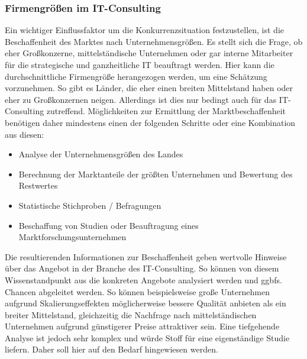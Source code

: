  \subsubsection{Firmengrößen im IT-Consulting}
Ein wichtiger Einflussfaktor um die Konkurrenzsituation festzustellen, ist die Beschaffenheit des Marktes nach Unternehmensgrößen.
 Es stellt sich die Frage, ob eher Großkonzerne, mittelständische Unternehmen oder gar interne Mitarbeiter für die strategische und ganzheitliche IT beauftragt werden.
 Hier kann die durchschnittliche Firmengröße herangezogen werden, um eine Schätzung vorzunehmen. So gibt es Länder, die eher einen breiten Mittelstand haben oder eher zu Großkonzernen neigen. 
 Allerdings ist dies nur bedingt auch für das IT-Consulting zutreffend. 
Möglichkeiten zur Ermittlung der Marktbeschaffenheit benötigen daher mindestens einen der folgenden Schritte oder eine Kombination aus diesen:
\begin{itemize}
\item Analyse der Unternehmensgrößen des Landes
\item Berechnung der Marktanteile der größten Unternehmen und Bewertung des Restwertes
\item Statistische Stichproben / Befragungen
\item Beschaffung von Studien oder Beauftragung eines Marktforschungsunternehmen
\end{itemize}
Die resultierenden Informationen zur Beschaffenheit geben wertvolle Hinweise über das Angebot in der Branche des IT-Consulting. 
So können von diesem Wissenstandpunkt aus die konkreten Angebote analysiert werden und ggbfs. Chancen abgeleitet werden. 
So können beispielsweise große Unternehmen aufgrund Skalierungseffekten möglicherweise bessere Qualität anbieten als ein breiter Mittelstand, gleichzeitig die Nachfrage nach mittelständischen Unternehmen aufgrund günstigerer Preise attraktiver sein. 
Eine tiefgehende Analyse ist jedoch sehr komplex und würde Stoff für eine eigenständige Studie liefern. Daher soll hier auf den Bedarf hingewiesen werden.


